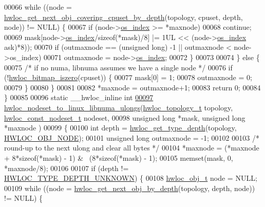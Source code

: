 \begin{DoxyCode}
00066     \textcolor{keywordflow}{while} ((node = \hyperlink{a00056_ga2f9a4ec15e9cfae8c21501257a51ce5b}{hwloc_get_next_obj_covering_cpuset_by_depth}(topology, cpuset, 
      depth, node)) != NULL) \{
00067       \textcolor{keywordflow}{if} (node->\hyperlink{a00016_a61a7a80a68eaccbaaa28269e678c81a9}{os_index} >= *maxnode)
00068         \textcolor{keywordflow}{continue};
00069       mask[node->\hyperlink{a00016_a61a7a80a68eaccbaaa28269e678c81a9}{os_index}/\textcolor{keyword}{sizeof}(*mask)/8] |= 1UL << (node->\hyperlink{a00016_a61a7a80a68eaccbaaa28269e678c81a9}{os_index} %
      ask)*8));
00070       \textcolor{keywordflow}{if} (outmaxnode == (\textcolor{keywordtype}{unsigned} \textcolor{keywordtype}{long}) -1 || outmaxnode < node->os\_index)
00071         outmaxnode = node->\hyperlink{a00016_a61a7a80a68eaccbaaa28269e678c81a9}{os_index};
00072     \}
00073 
00074   \} \textcolor{keywordflow}{else} \{
00075     \textcolor{comment}{/* if no numa, libnuma assumes we have a single node */}
00076     \textcolor{keywordflow}{if} (!\hyperlink{a00065_gaa94fed35d2a598bc4a8657b6955b7bf5}{hwloc_bitmap_iszero}(cpuset)) \{
00077       mask[0] = 1;
00078       outmaxnode = 0;
00079     \}
00080   \}
00081 
00082   *maxnode = outmaxnode+1;
00083   \textcolor{keywordflow}{return} 0;
00084 \}
00085 
00096 \textcolor{keyword}{static} \_\_hwloc\_inline \textcolor{keywordtype}{int}
\hypertarget{a00034_source_l00097}{}\hyperlink{a00068_gaf213df50d229c5d17a5a56b5d8f10b74}{00097} \hyperlink{a00068_gaf213df50d229c5d17a5a56b5d8f10b74}{hwloc_nodeset_to_linux_libnuma_ulongs}(\hyperlink{a00039_ga9d1e76ee15a7dee158b786c30b6a6e38}{hwloc_topology_t} topology, 
      \hyperlink{a00040_ga2f5276235841ad66a79bedad16a5a10c}{hwloc_const_nodeset_t} nodeset,
00098                                       \textcolor{keywordtype}{unsigned} \textcolor{keywordtype}{long} *mask, \textcolor{keywordtype}{unsigned} \textcolor{keywordtype}{long} *maxnode
      )
00099 \{
00100   \textcolor{keywordtype}{int} depth = \hyperlink{a00046_gaea7c64dd59467f5201ba87712710b14d}{hwloc_get_type_depth}(topology, \hyperlink{a00041_ggacd37bb612667dc437d66bfb175a8dc55aaf0964881117bdedf1a5e9332cd120dd}{HWLOC_OBJ_NODE});
00101   \textcolor{keywordtype}{unsigned} \textcolor{keywordtype}{long} outmaxnode = -1;
00102 
00103   \textcolor{comment}{/* round-up to the next ulong and clear all bytes */}
00104   *maxnode = (*maxnode + 8*\textcolor{keyword}{sizeof}(*mask) - 1) & ~(8*\textcolor{keyword}{sizeof}(*mask) - 1);
00105   memset(mask, 0, *maxnode/8);
00106 
00107   \textcolor{keywordflow}{if} (depth != \hyperlink{a00046_ggaf4e663cf42bbe20756b849c6293ef575a0565ab92ab72cb0cec91e23003294aad}{HWLOC_TYPE_DEPTH_UNKNOWN}) \{
00108     \hyperlink{a00016}{hwloc_obj_t} node = NULL;
00109     \textcolor{keywordflow}{while} ((node = \hyperlink{a00053_gab7c1dce3f42ece5bfa621e87cf332418}{hwloc_get_next_obj_by_depth}(topology, depth, node)) != NULL) \{
      

\end{DoxyCode}
